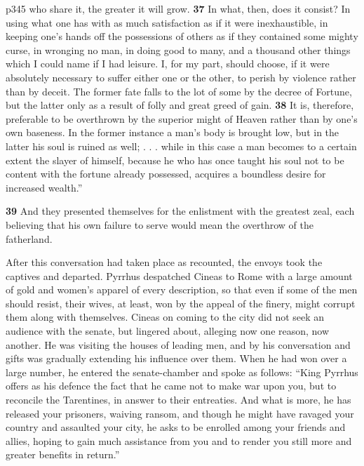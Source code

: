 p345 who share it, the greater it will grow. \textbf{37} In what, then, does it consist? In using what one has with as much satisfaction as if it were inexhaustible, in keeping one's hands off the possessions of others as if they contained some mighty curse, in wronging no man, in doing good to many, and a thousand other things which I could name if I had leisure. I, for my part, should choose, if it were absolutely necessary to suffer either one or the other, to perish by violence rather than by deceit. The former fate falls to the lot of some by the decree of Fortune, but the latter only as a result of folly and great greed of gain. \textbf{38} It is, therefore, preferable to be overthrown by the superior might of Heaven rather than by one's own baseness. In the former instance a man's body is brought low, but in the latter his soul is ruined as well; . . . while in this case a man becomes to a certain extent the slayer of himself, because he who has once taught his soul not to be content with the fortune already possessed, acquires a boundless desire for increased wealth.''

\textbf{39} And they presented themselves for the enlistment with the greatest zeal, each believing that his own failure to serve would mean the overthrow of the fatherland.

After this conversation had taken place as recounted, the envoys took the captives and departed. Pyrrhus despatched Cineas to Rome with a large amount of gold and women's apparel of every description, so that even if some of the men should resist, their wives, at least, won by the appeal of the finery, might corrupt them along with themselves. Cineas on coming to the city did not seek an audience with the senate, but lingered about, alleging now one reason, now another. He was visiting the houses of leading men, and by his conversation and gifts was gradually extending his influence over them. When he had won over a large number, he entered the senate-chamber and spoke as follows: ``King Pyrrhus offers as his defence the fact that he came not to make war upon you, but to reconcile the Tarentines, in answer to their entreaties. And what is more, he has released your prisoners, waiving ransom, and though he might have ravaged your country and assaulted your city, he asks to be enrolled among your friends and allies, hoping to gain much assistance from you and to render you still more and greater benefits in return.''

